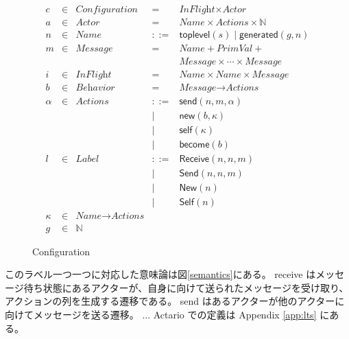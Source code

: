 \begin{figure}[tb]
  \begin{displaymath}
    \begin{array}{rclcl}
      c & \in & \textit{Configuration} & =   & \textit{InFlight} \times \textit{Actor} \\
      a & \in & \textit{Actor}  & =   & \textit{Name} \times \textit{Actions} \times \mathbb{N} \\
      n & \in & \textit{Name}   & ::= & \textsf{toplevel}(s) \mid \textsf{generated}(g, n) \\
      m & \in & \textit{Message} & =  & \textit{Name} + \textit{PrimVal} + \\
        &     &                 &     & \textit{Message} \times \cdots \times \textit{Message} \\
      i & \in & \textit{InFlight} & = & \textit{Name} \times \textit{Name} \times \textit{Message} \\
      b & \in & \textit{Behavior} & = & \textit{Message} \rightarrow \textit{Actions} \\
      \alpha & \in & \textit{Actions} & ::= & \textsf{send}(n, m, \alpha) \\
        &     &                 &   | & \textsf{new}(b, \kappa) \\
        &     &                 &   | & \textsf{self}(\kappa) \\
        &     &                 &   | & \textsf{become}(b) \\
      l & \in & \textit{Label}  & ::= & \textsf{Receive}(n, n, m) \\
        &     &                 &   | & \textsf{Send}(n, n, m) \\
        &     &                 &   | & \textsf{New}(n) \\
        &     &                 &   | & \textsf{Self}(n) \\
      \kappa & \in & \textit{Name} \rightarrow \textit{Actions} & & \\
      g & \in & \mathbb{N} & &
    \end{array}
  \end{displaymath}
  \caption{Configuration}\label{fig:config}
\end{figure}


このラベル一つ一つに対応した意味論は図\ref{semantics}にある。
receive はメッセージ待ち状態にあるアクターが、自身に向けて送られたメッセージを受け取り、アクションの列を生成する遷移である。
send はあるアクターが他のアクターに向けてメッセージを送る遷移。
...
Actario での定義は Appendix \ref{app:lts} にある。

